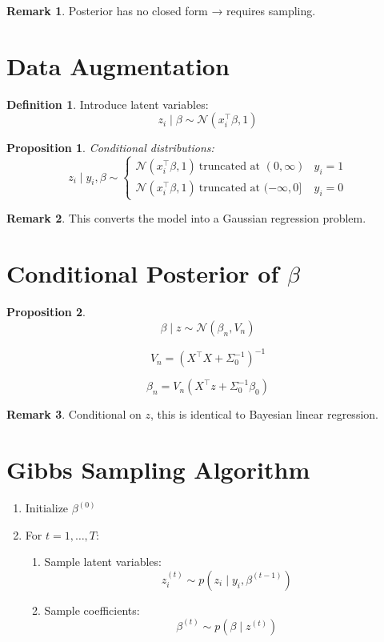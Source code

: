 \documentclass[12pt,oneside]{book}
\numberwithin{equation}{section}
\theoremstyle{definition}
\newtheorem{definition}{Definition}[section]
\newtheorem{remark}{Remark}[section]
\theoremstyle{plain}
\newtheorem{proposition}{Proposition}[section]
\theoremstyle{remark}
\newcommand{\Normal}{\mathcal{N}}
\begin{document}
\begin{remark}
Posterior has no closed form → requires sampling.
\end{remark}

\section{Data Augmentation}

\begin{definition}
Introduce latent variables:
$$
z_i \mid \beta \sim \Normal(x_i^\top \beta, 1)
$$
\end{definition}

\begin{proposition}
Conditional distributions:
$$
z_i \mid y_i, \beta
\sim
\begin{cases}
\Normal(x_i^\top \beta, 1)\ \text{truncated at } (0, \infty) & y_i = 1 \\
\Normal(x_i^\top \beta, 1)\ \text{truncated at } (-\infty, 0] & y_i = 0
\end{cases}
$$
\end{proposition}

\begin{remark}
This converts the model into a Gaussian regression problem.
\end{remark}

\section{Conditional Posterior of $\beta$}

\begin{proposition}
$$
\beta \mid z
\sim
\Normal(\beta_n, V_n)
$$

$$
V_n = (X^\top X + \Sigma_0^{-1})^{-1}
$$

$$
\beta_n = V_n (X^\top z + \Sigma_0^{-1}\beta_0)
$$
\end{proposition}

\begin{remark}
Conditional on $z$, this is identical to Bayesian linear regression.
\end{remark}

\section{Gibbs Sampling Algorithm}

\begin{algorithm}
\begin{enumerate}
\item Initialize $\beta^{(0)}$
\item For $t = 1,\dots,T$:
\begin{enumerate}
\item Sample latent variables:
$$
z_i^{(t)} \sim p(z_i \mid y_i, \beta^{(t-1)})
$$

\item Sample coefficients:
$$
\beta^{(t)} \sim p(\beta \mid z^{(t)})
$$
\end{enumerate}
\end{enumerate}
\end{algorithm}
\end{document}
